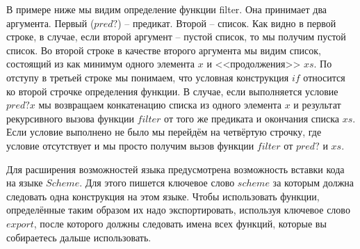     В примере ниже мы видим определение функции filter.
    Она принимает два аргумента.
    Первый ($pred?$) -- предикат. 
    Второй -- список.
    Как видно в первой строке, в случае, если второй аргумент -- пустой список, то мы получим пустой список.
    Во второй строке в качестве второго аргумента мы видим список, состоящий из как минимум одного элемента $x$ и <<продолжения>> $xs$.
    По отступу в третьей строке мы понимаем, что условная конструкция $if$ относится ко второй строчке определения функции.
    В случае, если выполняется условие $pred? x$ мы возвращаем конкатенацию списка из одного элемента $x$ и результат рекурсивного вызова функции $filter$ от того же предиката и окончания списка $xs$.
    Если условие выполнено не было мы перейдём на четвёртую строчку, где условие отсутствует и мы просто получим вызов функции $filter$ от $pred?$ и $xs$.

    

    Для расширения возможностей языка предусмотрена возможность вставки кода на языке $Scheme$.
    Для этого пишется ключевое слово $scheme$ за которым должна следовать одна конструкция на этом языке.
    Чтобы использовать функции, определённые таким образом их надо экспортировать, используя ключевое слово $export$, после которого должны следовать имена всех функций, которые вы собираетесь дальше использовать.
